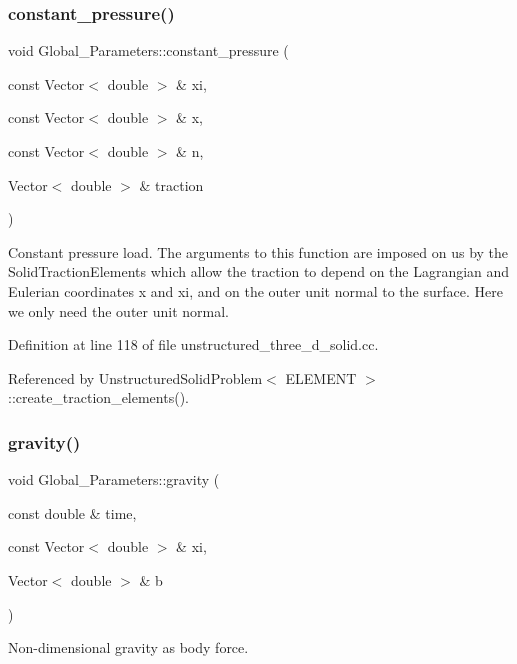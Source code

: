 \subsubsection{\texorpdfstring{constant\+\_\+pressure()}{constant\_pressure()}}
{\footnotesize\ttfamily void Global\+\_\+\+Parameters\+::constant\+\_\+pressure (\begin{DoxyParamCaption}\item[{const Vector$<$ double $>$ \&}]{xi,  }\item[{const Vector$<$ double $>$ \&}]{x,  }\item[{const Vector$<$ double $>$ \&}]{n,  }\item[{Vector$<$ double $>$ \&}]{traction }\end{DoxyParamCaption})}



Constant pressure load. The arguments to this function are imposed on us by the Solid\+Traction\+Elements which allow the traction to depend on the Lagrangian and Eulerian coordinates x and xi, and on the outer unit normal to the surface. Here we only need the outer unit normal. 



Definition at line 118 of file unstructured\+\_\+three\+\_\+d\+\_\+solid.\+cc.



Referenced by Unstructured\+Solid\+Problem$<$ E\+L\+E\+M\+E\+N\+T $>$\+::create\+\_\+traction\+\_\+elements().

\mbox{\label{namespaceGlobal__Parameters_a200109847bf4cc26da4d00e8d68d569e}} 
\subsubsection{\texorpdfstring{gravity()}{gravity()}}
{\footnotesize\ttfamily void Global\+\_\+\+Parameters\+::gravity (\begin{DoxyParamCaption}\item[{const double \&}]{time,  }\item[{const Vector$<$ double $>$ \&}]{xi,  }\item[{Vector$<$ double $>$ \&}]{b }\end{DoxyParamCaption})}



Non-\/dimensional gravity as body force. 




